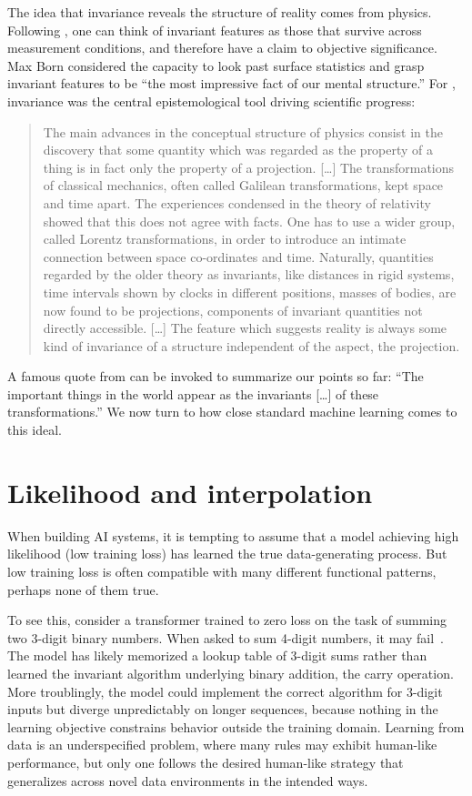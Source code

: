 The idea that invariance reveals the structure of reality comes from physics. Following \citet{weyl1952}, one can think of invariant features as those that survive across measurement conditions, and therefore have a claim to objective significance. Max Born considered the capacity to look past surface statistics and grasp invariant features to be ``the most impressive fact of our mental structure.'' For \citet{born1953}, invariance was the central epistemological tool driving scientific progress:

\begin{quote}
The main advances in the conceptual structure of physics consist in the discovery that some quantity which was regarded as the property of a thing is in fact only the property of a projection. [\ldots] The transformations of classical mechanics, often called Galilean transformations, kept space and time apart. The experiences condensed in the theory of relativity showed that this does not agree with facts. One has to use a wider group, called Lorentz transformations, in order to introduce an intimate connection between space co-ordinates and time. Naturally, quantities regarded by the older theory as invariants, like distances in rigid systems, time intervals shown by clocks in different positions, masses of bodies, are now found to be projections, components of invariant quantities not directly accessible. [\ldots] The feature which suggests reality is always some kind of invariance of a structure independent of the aspect, the projection. \citep[p. 144]{born1953}
\end{quote}

A famous quote from \citet[p. vii]{dirac1967} can be invoked to summarize our points so far: ``The important things in the world appear as the invariants [\ldots] of these transformations.'' We now turn to how close standard machine learning comes to this ideal.

\section{Likelihood and interpolation}\label{sec:likelihood}

When building AI systems, it is tempting to assume that a model achieving high likelihood (low training loss) has learned the true data-generating process. But low training loss is often compatible with many different functional patterns, perhaps none of them true.

To see this, consider a transformer trained to zero loss on the task of summing two 3-digit binary numbers. When asked to sum 4-digit numbers, it may fail~\citep{kartikcot}. The model has likely memorized a lookup table of 3-digit sums rather than learned the invariant algorithm underlying binary addition, the carry operation. More troublingly, the model could implement the correct algorithm for 3-digit inputs but diverge unpredictably on longer sequences, because nothing in the learning objective constrains behavior outside the training domain. Learning from data is an underspecified problem, where many rules may exhibit human-like performance, but only one follows the desired human-like strategy that generalizes across novel data environments in the intended ways.

